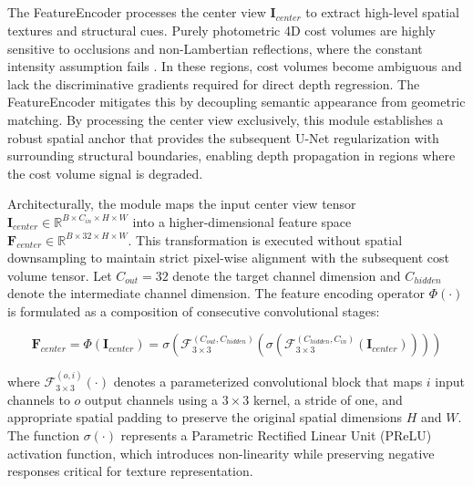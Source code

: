 \documentclass[lettersize,journal]{IEEEtran}
\begin{document}
\subsection{}

The FeatureEncoder processes the center view $\mathbf{I}_{center}$ to extract high-level spatial textures and structural cues. Purely photometric 4D cost volumes are highly sensitive to occlusions and non-Lambertian reflections, where the constant intensity assumption fails \cite{li2021}. In these regions, cost volumes become ambiguous and lack the discriminative gradients required for direct depth regression. The FeatureEncoder mitigates this by decoupling semantic appearance from geometric matching. By processing the center view exclusively, this module establishes a robust spatial anchor that provides the subsequent U-Net regularization with surrounding structural boundaries, enabling depth propagation in regions where the cost volume signal is degraded.

Architecturally, the module maps the input center view tensor $\mathbf{I}_{center} \in \mathbb{R}^{B \times C_{in} \times H \times W}$ into a higher-dimensional feature space $\mathbf{F}_{center} \in \mathbb{R}^{B \times 32 \times H \times W}$. This transformation is executed without spatial downsampling to maintain strict pixel-wise alignment with the subsequent cost volume tensor. Let $C_{out} = 32$ denote the target channel dimension and $C_{hidden}$ denote the intermediate channel dimension. The feature encoding operator $\Phi(\cdot)$ is formulated as a composition of consecutive convolutional stages:

\begin{equation}
\mathbf{F}_{center} = \Phi(\mathbf{I}_{center}) = \sigma \left( \mathcal{F}_{3 \times 3}^{(C_{out}, C_{hidden})} \left( \sigma \left( \mathcal{F}_{3 \times 3}^{(C_{hidden}, C_{in})} \left( \mathbf{I}_{center} \right) \right) \right) \right)
\end{equation}

where $\mathcal{F}_{3 \times 3}^{(o, i)}(\cdot)$ denotes a parameterized convolutional block that maps $i$ input channels to $o$ output channels using a $3 \times 3$ kernel, a stride of one, and appropriate spatial padding to preserve the original spatial dimensions $H$ and $W$. The function $\sigma(\cdot)$ represents a Parametric Rectified Linear Unit (PReLU) activation function, which introduces non-linearity while preserving negative responses critical for texture representation.
\end{document}
